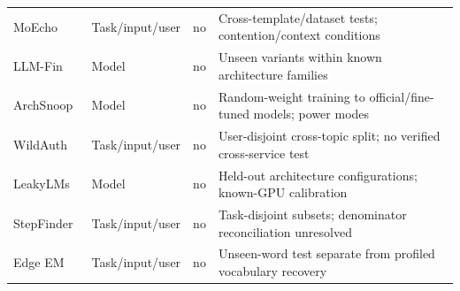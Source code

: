 \begin{longtable}{@{}p{}p{}p{}p{}@{}}
MoEcho~\cite{ding2025moecho} & Task/input/user & no & Cross-template/dataset tests; contention/context conditions\\
LLM-Fin~\cite{nazari2024llmfin} & Model & no & Unseen variants within known architecture families\\
ArchSnoop~\cite{weng2026archsnoop} & Model & no & Random-weight training to official/fine-tuned models; power modes\\
WildAuth~\cite{wang2026dialogue} & Task/input/user & no & User-disjoint cross-topic split; no verified cross-service test\\
LeakyLMs~\cite{majidi2026leakylms} & Model & no & Held-out architecture configurations; known-GPU calibration\\
StepFinder~\cite{zhu2026stepfinder} & Task/input/user & no & Task-disjoint subsets; denominator reconciliation unresolved\\
Edge EM~\cite{alhalawani2026physicaledge} & Task/input/user & no & Unseen-word test separate from profiled vocabulary recovery\\
\end{longtable}
